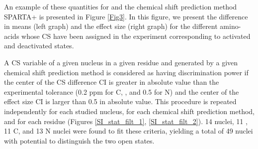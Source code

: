 \documentclass[%
 aip,
 amsmath,amssymb,
 preprint,%
]{revtex4-1}
\newcommand{\ca}{\ce{C_\alpha} }
\newcommand{\cb}{\ce{C_\beta} }
\begin{document}
An example of these quantities for \ca and the chemical shift prediction method SPARTA+ is presented in Figure \ref{Fig3}. In this figure, we present the difference in means (left graph) and the effect size (right graph) for the different amino-acids whose \ca CS have been assigned in the experiment corresponding to activated and deactivated states. 

A CS variable of a given nucleus in a given residue and generated by a given chemical shift prediction method is considered as having discrimination power if the center of the  CS difference CI is greater in absolute value than the experimental tolerance (0.2 ppm for C, \ca, \cb and 0.5 for N) and the center of the effect size CI is larger than 0.5 in absolute value. This procedure is repeated independently for each studied nucleus, for each chemical shift prediction method, and for each residue (Figures \ref{SI_stat_filt_1}, \ref{SI_stat_filt_2}). 14 \ca nuclei, 11 \cb, 11 C, and 13 N nuclei were found to fit these criteria, yielding a total of 49 nuclei with potential to distinguish the two open states.
\end{document}
